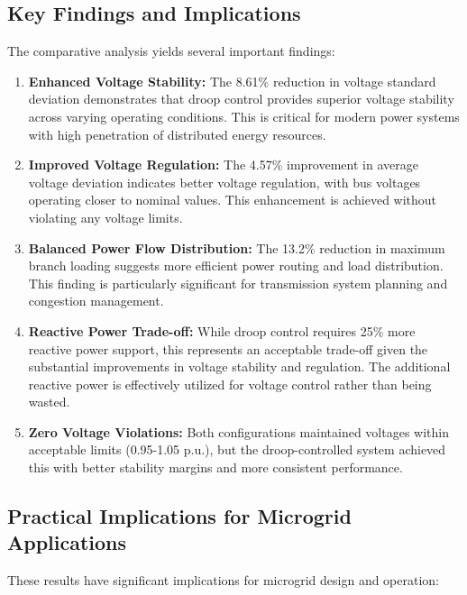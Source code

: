 \subsection{Key Findings and Implications}

The comparative analysis yields several important findings:

\begin{enumerate}
    \item \textbf{Enhanced Voltage Stability:} The 8.61\% reduction in voltage standard deviation demonstrates that droop control provides superior voltage stability across varying operating conditions. This is critical for modern power systems with high penetration of distributed energy resources.
    
    \item \textbf{Improved Voltage Regulation:} The 4.57\% improvement in average voltage deviation indicates better voltage regulation, with bus voltages operating closer to nominal values. This enhancement is achieved without violating any voltage limits.
    
    \item \textbf{Balanced Power Flow Distribution:} The 13.2\% reduction in maximum branch loading suggests more efficient power routing and load distribution. This finding is particularly significant for transmission system planning and congestion management.
    
    \item \textbf{Reactive Power Trade-off:} While droop control requires 25\% more reactive power support, this represents an acceptable trade-off given the substantial improvements in voltage stability and regulation. The additional reactive power is effectively utilized for voltage control rather than being wasted.
    
    \item \textbf{Zero Voltage Violations:} Both configurations maintained voltages within acceptable limits (0.95-1.05 p.u.), but the droop-controlled system achieved this with better stability margins and more consistent performance.
\end{enumerate}

\subsection{Practical Implications for Microgrid Applications}

These results have significant implications for microgrid design and operation:

